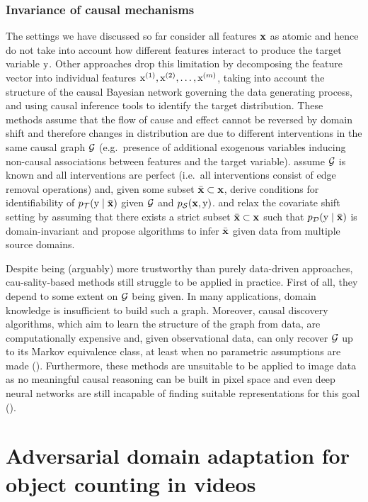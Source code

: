 \subsubsection{Invariance of causal mechanisms}
\label{sec:causal_da_sota}
The settings we have discussed so far consider all features ${\mathbf{x}}$ as atomic and hence do not take into account how different features interact to produce the target variable ${\textnormal{y}}$.  Other approaches drop this limitation by decomposing the feature vector into individual features ${\textnormal{x}}^{(1)},{\textnormal{x}}^{(2)},\dots,{\textnormal{x}}^{(m)}$, taking into account the structure of the causal Bayesian network governing the data generating process, and using causal inference tools to identify the target distribution. These methods assume that the flow of cause and effect cannot be reversed by domain shift and therefore changes in distribution are due to different interventions in the same causal graph ${\mathcal{G}}$ (e.g.\ presence of additional exogenous variables inducing non-causal associations between features and the target variable). \citet{Bareinboim2016} assume ${\mathcal{G}}$ is known and all interventions are perfect (i.e.\ all interventions consist of edge removal operations) and, given some subset $\bar{{\mathbf{x}}} \subset {\mathbf{x}}$, derive conditions for identifiability of $p_{\mathcal{T}}({\textnormal{y}} \mid \bar{{\mathbf{x}}})$ given ${\mathcal{G}}$ and $p_{\mathcal{S}}({\mathbf{x}}, {\textnormal{y}})$. \citet{Rojas2018} and \citet{Magliacane2018} relax the covariate shift setting by assuming that there exists a strict subset $\bar{{\mathbf{x}}} \subset {\mathbf{x}}$ such that $p_{\mathcal{D}}({\textnormal{y}} \mid \bar{{\mathbf{x}}})$ is domain-invariant and propose algorithms to infer $\bar{{\mathbf{x}}}$ given data from multiple source domains.

Despite being (arguably) more trustworthy than purely data-driven approaches, cau-\allowbreak sality-based methods still struggle to be applied in practice. First of all, they depend to some extent on ${\mathcal{G}}$ being given. In many applications, domain knowledge is insufficient to build such a graph. Moreover, causal discovery algorithms, which aim to learn the structure of the graph from data, are computationally expensive and, given observational data, can only recover ${\mathcal{G}}$ up to its Markov equivalence class, at least when no parametric assumptions are made  (\citet{Peters2014}). Furthermore, these methods are unsuitable to be applied to image data as no meaningful causal reasoning can be built in pixel space and even deep neural networks are still incapable of finding suitable representations for this goal (\citet{Scholkopf2021}).

\section{Adversarial domain adaptation for object counting in videos}
\label{sec:da_sensors}

